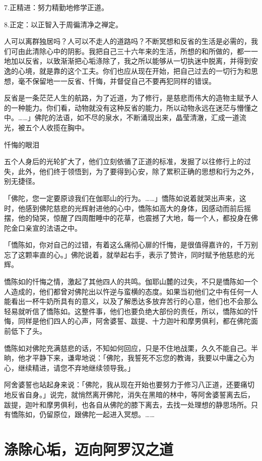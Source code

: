 \documentclass[12pt,twoside,openany]{book}
\begin{document}
7.正精进：努力精勤地修学正道。

8.正定：以正智入于周徧清净之禅定。

人可以离群独居吗？人可以不走人的道路吗？不断冥想和反省的生活是必需的，我们可由此清除心中的阴影。我把自己三十六年来的生活，所想的和所做的，都一一地加以反省，以致渐渐把心垢涤除了，我之所以能够从一切执迷中脱离，并得到安逸的心境，就是靠的这个工夫。你们也应从现在开始，把自己过去的一切行为和思想，毫不保留地一一反省、忏悔，并督促自己不要再犯同样的错误。

反省是一条茫茫人生的航路，为了近道，为了修行，是慈悲而伟大的造物主赋予人的一种能力。你们看，动物就没有这种反省的能力，所以动物永远在迷茫与懵懂之中。……」佛陀的法语，如不尽的泉水，不断涌现出来，晶莹清澈，汇成一道流光，被五个人收揽在胸中。

忏悔的眼泪

五个人身后的光轮扩大了，他们立刻依循了正道的标准，发掘了以往修行上的过失，此外，他们终于领悟到，为了要得到心安，除了累积正确的思想和行为之外，别无捷径。

「佛陀，您一定要原谅我们在伽耶山的行为。……」憍陈如说着就哭出声来，这时，他感到佛陀慈悲的光辉射进他的心中，憍陈如高大的身体，因感动而前后摇摆，他的恸哭，惊醒了四周酣睡中的花草，也震撼了大地，每一个人，都投身在佛陀金口亲宣的法语之中。

「憍陈如，你对自己的过错，有着这么痛彻心扉的忏悔，是很值得嘉许的，千万别忘了这颗率直的心。」佛陀说着，就举起右手，表示了赞许，同时赋予他慈悲的光辉。

憍陈如的忏悔之情，激起了其他四人的共鸣。伽耶山麓的过失，不只是憍陈如一个人造成的，他们都曾对佛陀出以忤逆与蛮横的态度。如果当初他们之中有任何一人能看出一杯牛奶所具有的意义，以及了解悉达多放弃苦行的心意，他们也不会那么轻易就听信了憍陈如。这整件事，他们也要负绝大部份的责任，所以，憍陈如的忏悔，同样是他们四人的心声，阿舍婆誓、跋提、十力迦叶和摩男俱利，都在佛陀面前低下了头。

憍陈如对佛陀充满慈悲的话，不知如何回应，只是不住地战栗，久久不能自己。半晌，他才平静下来，谦卑地说：「佛陀，我誓死不忘您的教诲，我要以中庸之心为心，继续精进，请您不弃地继续领导我。」

阿舍婆誓也站起身来说：「佛陀，我从现在开始也要努力于修习八正道，还要痛切地反省自身。」说完，就悄然离开佛陀，消失在黑暗的林中，等阿舍婆誓离去后，跋提，迦叶和摩男俱利，也各自从佛陀的膝下离去，去找一处理想的静思场所。只有憍陈如，仍留原位，跟佛陀一起进入冥想。……

\section{涤除心垢，迈向阿罗汉之道}\label{sec2.6}
\end{document}
